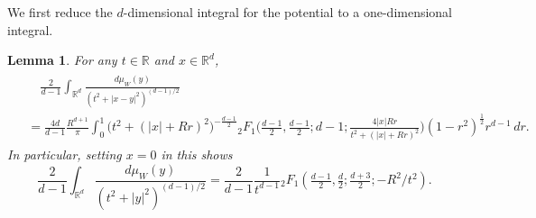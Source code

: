 \documentclass[10pt]{amsart}
\def\R{\mathbb{R}}
\theoremstyle{plain}
\newtheorem{lem}[thm]{Lemma}
\theoremstyle{remark}
\numberwithin{equation}{section}
\begin{document}
We first reduce the $d$-dimensional integral for the potential
to a one-dimensional integral.


\begin{lem} \label{Lem_integral ev for half space constraint}
For any $t \in \R$ and $x \in \R^d$,  
\begin{align}\label{3.24}
\begin{split}
&\quad  \frac{2}{d-1} \int_{ \R^d } \frac{ d\mu_W(y) }{ ( t^2+|x-y|^2 )^{(d-1)/2} }  
\\
&= \frac{4d}{d-1} \frac{R^{d+1}}{\pi}  \int_0^1 \Big( t^2+(|x|+Rr)^2  \Big)^{ -\frac{d-1}{2} } {}_2F_1\Big( \frac{d-1}{2}, \frac{d-1}{2}; d-1;  \frac{ 4 |x| R r }{ t^2+( |x|+R r )^2 }\Big) (1-r^2)^{\frac12} r^{d-1}\,dr .
\end{split}
\end{align} 
In particular, setting $x=0$ in this shows
\begin{equation}\label{3.25}
\frac{2}{d-1}\int_{ \R^d } \frac{d\mu_W(y)}{ (t^2+|y|^2)^{(d-1)/2} }= \frac{2}{d-1}  \frac{1}{t^{d-1} }   {}_2F_1( \tfrac{d-1}{2},\tfrac{d}{2};\tfrac{d+3}{2};-R^2/t^2 ). 
\end{equation}
\end{lem}
 
\end{document}
